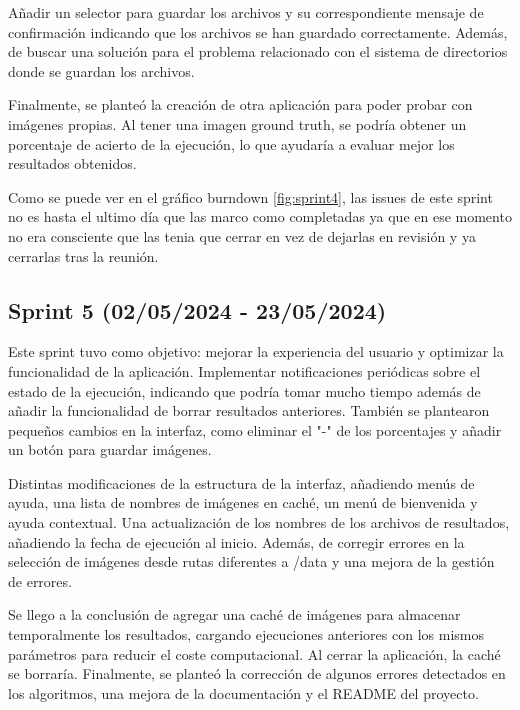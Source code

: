 Añadir un selector para guardar los archivos y su correspondiente mensaje de confirmación indicando que los archivos se han guardado correctamente. Además, de buscar una solución para el problema relacionado con el sistema de directorios donde se guardan los archivos.

Finalmente, se planteó la creación de otra aplicación para poder probar con imágenes propias. Al tener una imagen ground truth, se podría obtener un porcentaje de acierto de la ejecución, lo que ayudaría a evaluar mejor los resultados obtenidos.


Como se puede ver en el gráfico burndown \ref{fig:sprint4}, las issues de este sprint no es hasta el ultimo día que las marco como completadas ya que en ese momento no era consciente que las tenia que cerrar en vez de dejarlas en revisión y ya cerrarlas tras la reunión. 


\subsection{Sprint 5 (02/05/2024 - 23/05/2024)}\label{sprint-5}

Este sprint tuvo como objetivo: mejorar la experiencia del usuario y optimizar la funcionalidad de la aplicación. Implementar notificaciones periódicas sobre el estado de la ejecución, indicando que podría tomar mucho tiempo además de añadir la funcionalidad de borrar resultados anteriores. También se plantearon pequeños cambios en la interfaz, como eliminar el "-" de los porcentajes y añadir un botón para guardar imágenes.

Distintas modificaciones de la estructura de la interfaz, añadiendo menús de ayuda, una lista de nombres de imágenes en caché, un menú de bienvenida y ayuda contextual. Una actualización de los nombres de los archivos de resultados, añadiendo la fecha de ejecución al inicio. Además, de corregir errores en la selección de imágenes desde rutas diferentes a /data y una mejora de la gestión de errores.

Se llego a la conclusión de agregar una caché de imágenes para almacenar temporalmente los resultados, cargando ejecuciones anteriores con los mismos parámetros para reducir el coste computacional. Al cerrar la aplicación, la caché se borraría. Finalmente, se planteó la corrección de algunos errores detectados en los algoritmos, una mejora de la documentación y el README del proyecto.


